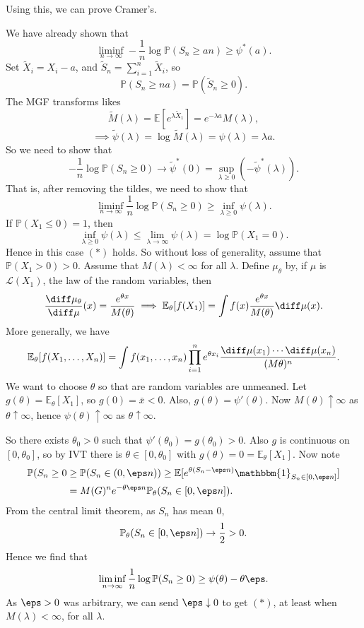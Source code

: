\documentclass[12pt]{article}
\begin{document}
Using this, we can prove Cramer's.

\begin{proofbox}
	We have already shown that
	\[
	\liminf_{n \to \infty} - \frac 1n \log \mathbb{P}(S_n \geq an) \geq \psi^{\ast}(a).
	\]
	Set $\tilde X_i = X_i - a$, and $\tilde S_n = \sum_{i = 1}^n \tilde X_i$, so
	\[
	\mathbb{P}(S_n \geq na) = \mathbb{P}(\tilde S_n \geq 0).
	\]
	The MGF transforms likes
	\[
	\tilde M (\lambda) = \mathbb{E}[e ^{\lambda \tilde X_1}]=  e^{-\lambda a} M(\lambda),
	\]
	\[
	\implies \tilde \psi(\lambda) = \log \tilde M(\lambda) = \psi(\lambda) = \lambda a.
	\]
	So we need to show that
	\[
	- \frac 1n \log \mathbb{P}(S_n \geq 0) \to \tilde \psi^{\ast}(0) = \sup_{\lambda \geq 0} (- \tilde \psi^{\ast}(\lambda)).
	\]
	That is, after removing the tildes, we need to show that
	\[
		\liminf_{n \to \infty} \frac 1n \log \mathbb{P}(S_n \geq 0) \geq \inf_{\lambda \geq 0} \psi(\lambda). \tag{$\ast$}
	\]
	If $\mathbb{P}(X_1 \leq 0) = 1$, then
	\[
	\inf_{\lambda \geq 0} \psi(\lambda) \leq \lim_{\lambda \to \infty} \psi(\lambda) = \log \mathbb{P}(X_1 = 0).
	\]
	Hence in this case $(\ast)$ holds. So without loss of generality, assume that $\mathbb{P}(X_1 > 0) > 0$. Assume that $M(\lambda) < \infty$ for all $\lambda$. Define $\mu_\theta$ by, if $\mu$ is $\mathcal{L}(X_1)$, the law of the random variables, then
	\[
	\frac{\diff \mu_\theta}{\diff \mu}(x) = \frac{e^{\theta x}}{M(\theta)} \implies \mathbb{E}_\theta[f(X_1)] = \int f(x) \frac{e^{\theta x}}{M(\theta)} \diff \mu(x).
	\]
	More generally, we have
	\[
	\mathbb{E}_\theta[f(X_1, \ldots, X_n)] = \int f(x_1, \ldots, x_n) \prod_{i = 1}^n e^{\theta x_i} \frac{\diff \mu(x_1) \cdots \diff \mu(x_n)}{(M\theta)^n}.
	\]
	We want to choose $\theta$ so that are random variables are unmeaned. Let $g(\theta) = \mathbb{E}_\theta[X_1]$, so $g(0) = \bar x < 0$. Also, $g(\theta) = \psi'(\theta)$. Now $M(\theta) \uparrow \infty$ as $\theta \uparrow \infty$, hence $\psi(\theta) \uparrow \infty$ as $\theta \uparrow \infty$.

	So there exists $\theta_0 > 0$ such that $\psi'(\theta_0) = g(\theta_0) > 0$. Also $g$ is continuous on $[0, \theta_0]$, so by IVT there is $\theta \in [0, \theta_0]$ with $g(\theta) = 0 = \mathbb{E}_\theta[X_1]$. Now note
	\begin{align*}
		\mathbb{P}(S_n \geq 0 &\geq \mathbb{P}(S_n \in (0, \eps n)) \geq \mathbb{E}[e^{\theta(S_n - \eps n)} \mathbbm{1}_{S_n \in [0, \eps n]}] \\
				      &= M(G)^{n} e^{-\theta \eps n} \mathbb{P}_\theta (S_n \in [0, \eps n]).
	\end{align*}
	From the central limit theorem, as $S_n$ has mean $0$,
	\[
		\mathbb{P}_\theta (S_n \in [0, \eps n] ) \to \frac 12 > 0.
	\]
	Hence we find that
	\[
	\liminf_{n \to \infty} \frac 1n \log \mathbb{P}(S_n \geq 0) \geq \psi(\theta) - \theta \eps.
	\]
	As $\eps > 0$ was arbitrary, we can send $\eps \downarrow 0$ to get $(\ast)$, at least when $M(\lambda) < \infty$, for all $\lambda$.


\end{proofbox}
\end{document}
